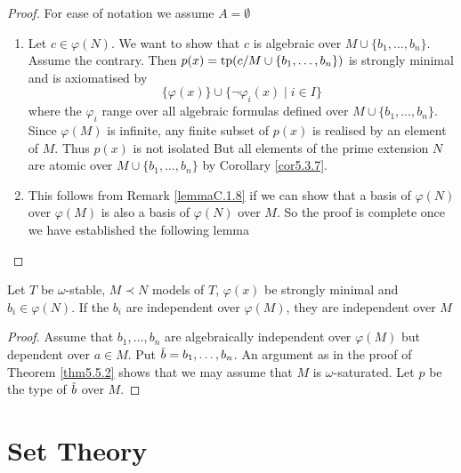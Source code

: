 \documentclass[11pt]{article}
\begin{document}
\begin{proof}
For ease of notation we assume \(A=\emptyset\)
\begin{enumerate}
\item Let \(c\in\varphi(N)\). We want to show that \(c\) is algebraic over \(M\cup\{b_1,\dots,b_n\}\). Assume the
contrary. Then \(p(x)=\operatorname{tp}(c/M\cup\{b_1,\dots,b_n\})\) is strongly minimal
and is axiomatised by
\begin{equation*}
\{\varphi(x)\}\cup\{\neg\varphi_i(x)\mid i\in I\}
\end{equation*}
where the \(\varphi_i\) range over all algebraic formulas defined over \(M\cup\{b_1,\dots,b_n\}\).
Since \(\varphi(M)\) is infinite, any finite subset of \(p(x)\) is realised by an element of \(M\).
Thus \(p(x)\) is not isolated
\wu{
\label{Problem11}
}
But all elements of the prime extension \(N\) are atomic
over \(M\cup\{b_1,\dots,b_n\}\) by Corollary \ref{cor5.3.7}.
\item This follows from Remark \ref{lemmaC.1.8} if we can show that a basis of \(\varphi(N)\) over \(\varphi(M)\)
is also a basis of \(\varphi(N)\) over \(M\). So the proof is complete once we have established the
following lemma
\end{enumerate}
\end{proof}

\begin{lemma}[]
Let \(T\) be \(\omega\)-stable, \(M\prec N\) models of \(T\), \(\varphi(x)\) be strongly minimal and \(b_i\in\varphi(N)\).
If the \(b_i\) are independent over \(\varphi(M)\), they are independent over \(M\)
\end{lemma}

\begin{proof}
Assume that \(b_1,\dots,b_n\) are algebraically independent over \(\varphi(M)\) but dependent
over \(a\in M\). Put \(\barb=b_1,\dots,b_n\). An argument as in the proof of Theorem \ref{thm5.5.2} shows
that we may assume that \(M\) is \(\omega\)-saturated. Let \(p\) be the type of \(\barb\) over \(M\).
\end{proof}


\appendix
\section{Set Theory}
\label{sec:org7e8cac7}
\end{document}
